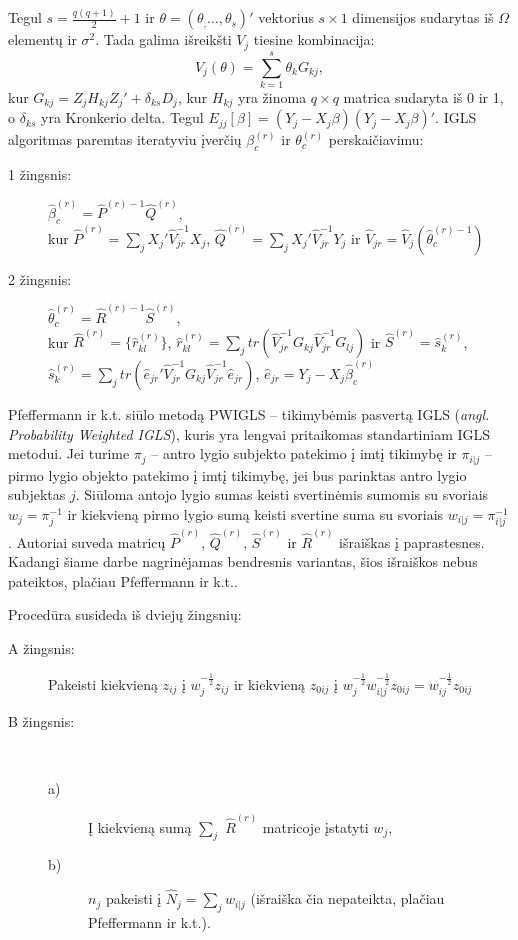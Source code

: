 \documentclass[12pt,a4paper]{article}
\begin{document}
\indent Tegul $s=\frac{q(q+1)}{2}+1$ ir $\theta=(\theta_,\dots,\theta_s)'$ vektorius $s\times 1$ dimensijos sudarytas iš $\Omega$ elementų ir $\sigma^2$. Tada galima išreikšti $V_j$ tiesine kombinacija:
\begin{equation}
V_j(\theta)=\sum_{k=1}^s \theta_k G_{kj},
\end{equation}
kur $G_{kj}=Z_jH_{kj}Z_j'+\delta_{ks}D_j$, kur $H_{kj}$ yra žinoma $q\times q$ matrica sudaryta iš 0 ir 1, o $\delta_{ks}$ yra Kronkerio delta. Tegul $E_{jj}[\beta]=(Y_j-X_j\beta)(Y_j-X_j\beta)'$. IGLS algoritmas paremtas iteratyviu įverčių $\beta_c^{(r)}$ ir $\theta_c^{(r)}$ perskaičiavimu:
\begin{description}
\item[1 žingsnis:] $\hat{\beta}_c^{(r)}=\hat{P}^{(r)-1}\hat{Q}^{(r)}$,\\
kur $\hat{P}^{(r)}=\sum_jX_j'\hat{V}_{jr}^{-1}X_j$, $\hat{Q}^{(r)}=\sum_jX_j'\hat{V}_{jr}^{-1}Y_j$ ir $\hat{V}_{jr}=\hat{V}_j\left(\hat{\theta}_c^{(r)-1}\right)$
\item[2 žingsnis:] $\hat{\theta}_c^{(r)}=\hat{R}^{(r)-1}\hat{S}^{(r)}$,\\
kur $\hat{R}^{(r)}=\{\hat{r}_{kl}^{(r)}\}$, $\hat{r}_{kl}^{(r)}=\sum_jtr\left(\hat{V}_{jr}^{-1}G_{kj}\hat{V}_{jr}^{-1}G_{lj}\right)$ ir $\hat{S}^{(r)}=\hat{s}_k^{(r)}$, $\hat{s}_k^{(r)}=\sum_jtr\left(\hat{e}_{jr}'\hat{V}_{jr}^{-1}G_{kj}\hat{V}_{jr}^{-1}\hat{e}_{jr}\right)$, $\hat{e}_{jr}=Y_j - X_j\hat{\beta}_c^{(r)}$
\end{description}

\indent Pfeffermann ir k.t. siūlo metodą PWIGLS -- tikimybėmis pasvertą IGLS (\textit{angl. Probability Weighted IGLS}), kuris yra lengvai pritaikomas standartiniam IGLS metodui. Jei turime $\pi_j$ -- antro lygio subjekto patekimo į imtį tikimybę ir $\pi_{i|j}$ -- pirmo lygio objekto patekimo į imtį tikimybę, jei bus parinktas antro lygio subjektas $j$. Siūloma antojo lygio sumas keisti svertinėmis sumomis su svoriais $w_j=\pi_j^{-1}$ ir kiekvieną pirmo lygio sumą keisti svertine suma su svoriais $w_{i|j}=\pi_{i|j}^{-1}$. Autoriai suveda matricų $\hat{P}^{(r)}$, $\hat{Q}^{(r)}$, $\hat{S}^{(r)}$ ir $\hat{R}^{(r)}$ išraiškas į paprastesnes. Kadangi šiame darbe nagrinėjamas bendresnis variantas, šios išraiškos nebus pateiktos, plačiau  Pfeffermann ir k.t.\cite{pfeff}.

Procedūra susideda iš dviejų žingsnių:
\begin{description}
\item[A žingsnis:] Pakeisti kiekvieną $z_{ij}$ į $w_j^{-\frac{1}{2}}z_{ij}$ ir kiekvieną $z_{0ij}$ į $w_j^{-\frac{1}{2}}w_{i|j}^{-\frac{1}{2}}z_{0ij}=w_{ij}^{-\frac{1}{2}}z_{0ij}$
\item[B žingsnis:] \ 
\begin{description}
\item[a)] Į kiekvieną sumą $\sum_j$ $\hat{R}^{(r)}$ matricoje įstatyti $w_j$,
\item[b)] $n_j$ pakeisti į $\hat{N}_j=\sum_jw_{i|j}$ (išraiška čia nepateikta, plačiau  Pfeffermann ir k.t.\cite{pfeff}).
\end{description}
\end{description}
\end{document}
